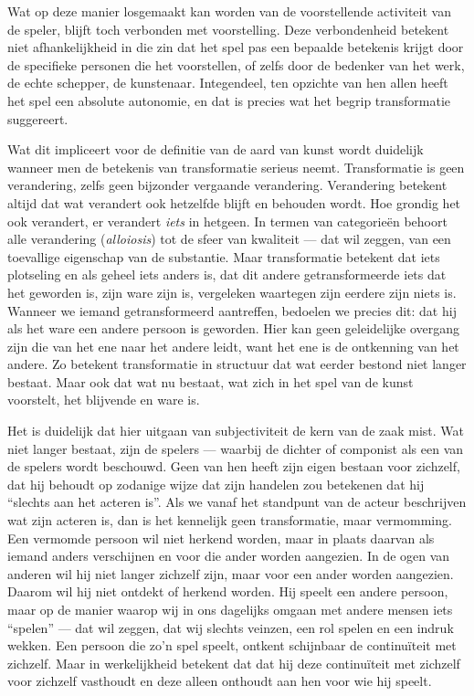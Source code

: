 Wat op deze manier losgemaakt kan worden van de voorstellende activiteit van de speler, blijft toch verbonden met voorstelling. Deze verbondenheid betekent niet afhankelijkheid in die zin dat het spel pas een bepaalde betekenis krijgt door de specifieke personen die het voorstellen, of zelfs door de bedenker van het werk, de echte schepper, de kunstenaar. Integendeel, ten opzichte van hen allen heeft het spel een absolute autonomie, en dat is precies wat het begrip transformatie suggereert.

Wat dit impliceert voor de definitie van de aard van kunst wordt duidelijk wanneer men de betekenis van transformatie serieus neemt. Transformatie is geen verandering, zelfs geen bijzonder vergaande verandering. Verandering betekent altijd dat wat verandert ook hetzelfde blijft en behouden wordt. Hoe grondig het ook verandert, er verandert \textit{iets} in hetgeen. In termen van categorieën behoort alle verandering (\textit{alloiosis}) tot de sfeer van kwaliteit — dat wil zeggen, van een toevallige eigenschap van de substantie. Maar transformatie betekent dat iets plotseling en als geheel iets anders is, dat dit andere getransformeerde iets dat het geworden is, zijn ware zijn is, vergeleken waartegen zijn eerdere zijn niets is. Wanneer we iemand getransformeerd aantreffen, bedoelen we precies dit: dat hij als het ware een andere persoon is geworden. Hier kan geen geleidelijke overgang zijn die van het ene naar het andere leidt, want het ene is de ontkenning van het andere. Zo betekent transformatie in structuur dat wat eerder bestond niet langer bestaat. Maar ook dat wat nu bestaat, wat zich in het spel van de kunst voorstelt, het blijvende en ware is.

Het is duidelijk dat hier uitgaan van subjectiviteit de kern van de zaak mist. Wat niet langer bestaat, zijn de spelers — waarbij de dichter of componist als een van de spelers wordt beschouwd. Geen van hen heeft zijn eigen bestaan voor zichzelf, dat hij behoudt op zodanige wijze dat zijn handelen zou betekenen dat hij ``slechts aan het acteren is''. Als we vanaf het standpunt van de acteur beschrijven wat zijn acteren is, dan is het kennelijk geen transformatie, maar vermomming. Een vermomde persoon wil niet herkend worden, maar in plaats daarvan als iemand anders verschijnen en voor die ander worden aangezien. In de ogen van anderen wil hij niet langer zichzelf zijn, maar voor een ander worden aangezien. Daarom wil hij niet ontdekt of herkend worden. Hij speelt een andere persoon, maar op de manier waarop wij in ons dagelijks omgaan met andere mensen iets ``spelen'' — dat wil zeggen, dat wij slechts veinzen, een rol spelen en een indruk wekken. Een persoon die zo'n spel speelt, ontkent schijnbaar de continuïteit met zichzelf. Maar in werkelijkheid betekent dat dat hij deze continuïteit met zichzelf voor zichzelf vasthoudt en deze alleen onthoudt aan hen voor wie hij speelt.

